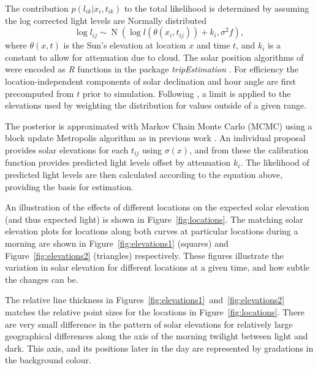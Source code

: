 \documentclass[10pt]{article}
\begin{document}


The contribution $p(l_{ik}| x_{i}, t_{ik})$ to the total likelihood is determined
by assuming the log corrected light levels are Normally distributed
\begin{displaymath}
  \log l_{ij} \sim \operatorname{N}
  \left (\log l(\theta(x_{i},t_{ij}))+k_{i},
    \sigma^{2}f
  \right ),
\end{displaymath}
where $\theta(x,t)$ is the Sun's elevation at location $x$ and time
$t$, and $k_{i}$ is a constant to allow for attenuation due to cloud.
The solar position algorithms of \cite{M91} were encoded as \emph{R}
functions in the package \emph{tripEstimation} \cite{tripEstimation}.
For efficiency the location-independent components of solar
declination and hour angle are first precomputed from $t$ prior to
simulation.  Following \cite{Ekstrom}, a limit is applied to the
elevations used by weighting the distribution for values outside of a
given range.

The posterior is approximated with Markov Chain Monte Carlo (MCMC)
using a block update Metropolis algorithm as in previous work
\cite{sumner2009}.  An individual proposal provides solar elevations
for each $t_{ij}$ using $\sigma(x)$, and from these the calibration
function provides predicted light levels offset by attenuation
$k_{i}$. The likelihood of predicted light levels are then calculated
according to the equation above, providing the basis for estimation.

An illustration of the effects of different locations on the expected
solar elevation (and thus expected light) is shown in
Figure~\ref{fig:locations}. The matching solar elevation plots for
locations along both curves at particular locations during a morning
are shown in Figure~\ref{fig:elevations1} (squares) and
Figure~\ref{fig:elevations2} (triangles) respectively. These figures
illustrate the variation in solar elevation for different locations at
a given time, and how subtle the changes can be.

The relative line thickness in
Figures~\ref{fig:elevations1}~and~\ref{fig:elevations2} matches the
relative point sizes for the locations in
Figure~\ref{fig:locations}. There are very small difference in the
pattern of solar elevations for relatively large geographical
differences along the axis of the morning twilight between light and
dark. This axis, and its positions later in the day are represented by
gradations in the background colour.
\end{document}
